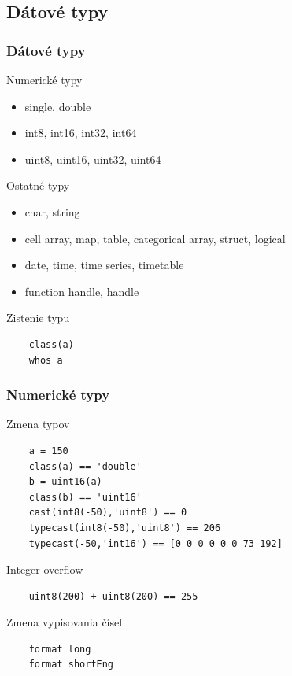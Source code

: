 \documentclass{beamer}
\begin{document}
\subsection{Dátové typy}

\begin{frame}[fragile]
\frametitle{Dátové typy}
 
  \begin{block}{Numerické typy}
    \begin{itemize}
      \item single, double
      \item int8, int16, int32, int64
      \item uint8, uint16, uint32, uint64
    \end{itemize}
  \end{block}
  
  \pause
  
  \begin{block}{Ostatné typy}
  \begin{itemize}
      \item char, string
      \item cell array, map, table, categorical array, struct, logical
      \item date, time, time series, timetable
      \item function handle, handle
  \end{itemize}
  \end{block}
  
  \pause
  
  \begin{block}{Zistenie typu}
  \begin{verbatim}
    class(a)
    whos a \end{verbatim}
  \end{block}
\end{frame}
  
\begin{frame}[fragile]
\frametitle{Numerické typy}   
  
  \begin{block}{Zmena typov}
    \begin{verbatim}
    a = 150
    class(a) == 'double'
    b = uint16(a)
    class(b) == 'uint16'
    cast(int8(-50),'uint8') == 0
    typecast(int8(-50),'uint8') == 206
    typecast(-50,'int16') == [0 0 0 0 0 0 73 192]\end{verbatim}    
  \end{block}  
  
  \pause
  
  \begin{alertblock}{Integer overflow}
    \begin{verbatim}
    uint8(200) + uint8(200) == 255 \end{verbatim}
  \end{alertblock}
  
  \pause
  
  \begin{block}{Zmena vypisovania čísel}
    \begin{verbatim}
    format long
    format shortEng
\end{verbatim}    
  \end{block}  
\end{frame}
\end{document}
